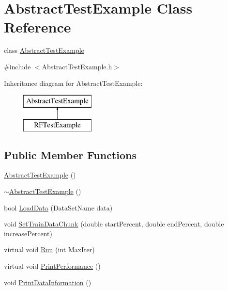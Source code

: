 \hypertarget{class_abstract_test_example}{}\section{Abstract\+Test\+Example Class Reference}
\label{class_abstract_test_example}


class \hyperlink{class_abstract_test_example}{Abstract\+Test\+Example}  




{\ttfamily \#include $<$Abstract\+Test\+Example.\+h$>$}

Inheritance diagram for Abstract\+Test\+Example\+:\begin{figure}[H]
\begin{center}
\leavevmode
\includegraphics[height=2.000000cm]{class_abstract_test_example}
\end{center}
\end{figure}
\subsection*{Public Member Functions}
\begin{DoxyCompactItemize}
\item 
\hyperlink{class_abstract_test_example_aba49e3392989d9bd96f01a570c0b1136}{Abstract\+Test\+Example} ()
\item 
\hyperlink{class_abstract_test_example_aea4e826ad11ebf45f1ec9a70eacd60eb}{$\sim$\+Abstract\+Test\+Example} ()
\item 
bool \hyperlink{class_abstract_test_example_a61d97ab0e5ff9496902168c09ac733e9}{Load\+Data} (Data\+Set\+Name data)
\item 
void \hyperlink{class_abstract_test_example_af0c5621acae6f8b30f372517a7dacbe5}{Set\+Train\+Data\+Chunk} (double start\+Percent, double end\+Percent, double increase\+Percent)
\item 
virtual void \hyperlink{class_abstract_test_example_a7ad10a9fa18201ab05fc27528a8b52e6}{Run} (int Max\+Iter)
\item 
virtual void \hyperlink{class_abstract_test_example_ab887dba326820db0a9c896ec83559e75}{Print\+Performance} ()
\item 
void \hyperlink{class_abstract_test_example_a785757c20c8467927495481b56d12e67}{Print\+Data\+Information} ()
\end{DoxyCompactItemize}
